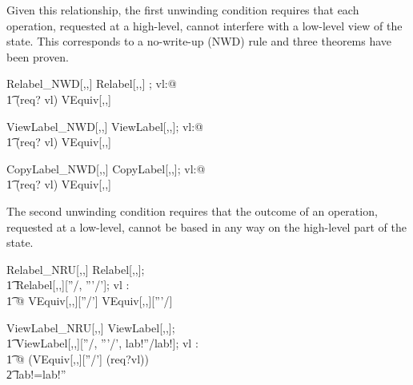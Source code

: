 Given this relationship, the first unwinding condition requires that 
each operation, requested at a high-level, cannot interfere with a low-level
view of the state. This corresponds to a no-write-up (NWD) rule and
three theorems have been proven. 

\begin{theorem}{Relabel\_NWD}[\LEVEL,\LABEL,\FID]
\forall Relabel[\LEVEL,\LABEL,\FID] ; vl:\LEVEL @ 
\\
\t1  \lnot (req? \fleq vl) \implies VEquiv[\LEVEL,\LABEL,\FID]
\end{theorem}

\begin{theorem}{ViewLabel\_NWD}[\LEVEL,\LABEL,\FID]
\forall ViewLabel[\LEVEL,\LABEL,\FID]; vl:\LEVEL @ 
\\
\t1  \lnot (req? \fleq vl) \implies VEquiv[\LEVEL,\LABEL,\FID]
\end{theorem}

\begin{theorem}{CopyLabel\_NWD}[\LEVEL,\LABEL,\FID]
\forall CopyLabel[\LEVEL,\LABEL,\FID]; vl:\LEVEL @
\\
\t1  \lnot (req? \fleq vl) \implies VEquiv[\LEVEL,\LABEL,\FID]
\end{theorem}

The second unwinding condition requires that the outcome
of an operation, requested at a low-level, cannot be based 
in any way on the high-level part of the state.

\begin{theorem}{Relabel\_NRU}[\LEVEL,\LABEL,\FID]
\forall 
        Relabel[\LEVEL,\LABEL,\FID]; \\
\t1        Relabel[\LEVEL,\LABEL,\FID][\delta''/\delta, \delta'''/\delta']; 
        vl : \LEVEL  
\\
\t1 @ VEquiv[\LEVEL,\LABEL,\FID][\delta''/\delta'] 
\implies 
 VEquiv[\LEVEL,\LABEL,\FID][\delta'''/\delta] 
\end{theorem}

\begin{theorem}{ViewLabel\_NRU}[\LEVEL,\LABEL,\FID]
\forall ViewLabel[\LEVEL,\LABEL,\FID]; \\
\t1        ViewLabel[\LEVEL,\LABEL,\FID][\delta''/\delta, \delta'''/\delta', lab!''/lab!]; 
        vl : \LEVEL  \\
\t1 @ (VEquiv[\LEVEL,\LABEL,\FID][\delta''/\delta'] \land (req?\fleq vl))\\
\t2 \implies  
lab!=lab!''
\end{theorem}


